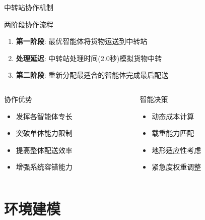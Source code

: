 \documentclass[
10pt,
aspectratio=169,
]{beamer}
\begin{document}
\begin{frame}{中转站协作机制}
    \begin{block}{两阶段协作流程}
        \begin{enumerate}
            \item \textbf{第一阶段}: 最优智能体将货物运送到中转站
            \item \textbf{处理延迟}: 中转站处理时间(2.0秒)模拟货物中转
            \item \textbf{第二阶段}: 重新分配最适合的智能体完成最后配送
        \end{enumerate}
    \end{block}
    
    \begin{columns}
        \begin{column}{0.5\textwidth}
            \begin{exampleblock}{协作优势}
                \begin{itemize}
                    \item 发挥各智能体专长
                    \item 突破单体能力限制
                    \item 提高整体配送效率
                    \item 增强系统容错能力
                \end{itemize}
            \end{exampleblock}
        \end{column}
        \begin{column}{0.5\textwidth}
            \begin{alertblock}{智能决策}
                \begin{itemize}
                    \item 动态成本计算
                    \item 载重能力匹配
                    \item 地形适应性考虑
                    \item 紧急度权重调整
                \end{itemize}
            \end{alertblock}
        \end{column}
    \end{columns}
\end{frame}


\section{环境建模}
\end{document}
